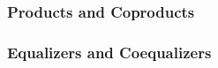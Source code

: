 \documentclass[12pt]{amsart}
\theoremstyle{definition}
\DeclareMathOperator*{\0}{\mbf{0}}
\DeclareMathOperator*{\1}{\mbf{1}}
\begin{document}
	
	
	
	
	
	
	
	
	
	
	
	
	
	
	
	
	
	
	\subsubsection{Products and Coproducts}
	
	
	
	
	
	
	
	
	
	
	
	
	
	
	
	\subsubsection{Equalizers and Coequalizers}
	
	

	
	
	
	
	
	
	
	
	
	
	
	
	
	

	
	
	
	
	
	
	
	
	
	
	
	
	
	
	
	
	
	
	
	
	
	
	
	
	
	
	
	
	
	
	
	
	
	
	
	
	
	
	
	
	
	
	
	
\end{document}

